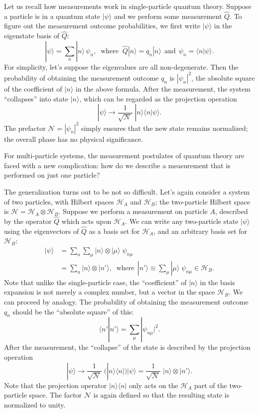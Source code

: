 \documentclass[pra,11pt]{revtex4}
\begin{document}
Let us recall how measurements work in single-particle quantum
theory.  Suppose a particle is in a quantum state $|\psi\rangle$
and we perform some measurement $\hat{Q}$.  To figure out the
measurement outcome probabilities, we first write $|\psi\rangle$ in
the eigenstate basis of $\hat{Q}$:
$$|\psi\rangle = \sum_n |n\rangle\,\psi_n, \;\;\mathrm{where}\;\;\hat{Q}|n\rangle = q_n |n\rangle \;\,\textrm{and}\;\, \psi_n = \langle n|\psi\rangle.$$
For simplicity, let's suppose the eigenvalues are all non-degenerate.
Then the probability of obtaining the measurement outcome $q_n$ is
$|\psi_n|^2$, the absolute square of the coefficient of
$|n\rangle$ in the above formula.  After the measurement, the system
``collapses'' into state $|n\rangle$, which can be regarded as the
projection operation
$$|\psi\rangle \rightarrow \frac{1}{\sqrt{\mathcal{N}}}\; |n\rangle\langle n|\psi\rangle.$$
The prefactor $\mathcal{N} = |\psi_n|^2$ simply ensures that the new
state remains normalized; the overall phase has no physical
significance.

For multi-particle systems, the measurement postulates of quantum
theory are faced with a new complication: how do we describe a
measurement that is performed on just one particle?

The generalization turns out to be not so difficult.  Let's again
consider a system of two particles, with Hilbert spaces
$\mathscr{H}_A$ and $\mathscr{H}_B$; the two-particle Hilbert space is
$\mathscr{H} = \mathscr{H}_A \otimes \mathscr{H}_B$.  Suppose we
perform a measurement on particle $A$, described by the operator
$\hat{Q}$ which acts upon $\mathscr{H}_A$.  We can write any two-particle
state $|\psi\rangle$ using the eigenvectors of $\hat{Q}$ as a basis
set for $\mathscr{H}_A$, and an arbitrary basis set for
$\mathscr{H}_B$:
$$\begin{aligned}|\psi\rangle &= \sum_{n}\sum_{\mu} |n\rangle\otimes |\mu\rangle \;\psi_{n\mu} \\&= \sum_n |n\rangle\otimes |n'\rangle, \;\;\mathrm{where}\;\,|n'\rangle\equiv \sum_\mu |\mu\rangle \;\psi_{n\mu} \in \mathscr{H}_B.\end{aligned}$$
Note that unlike the single-particle case, the ``coefficient'' of
$|n\rangle$ in the basis expansion is not merely a complex number, but
a vector in the space $\mathscr{H}_B$.  We can proceed by
analogy.  The probability of obtaining the measurement outcome $q_n$
should be the ``absolute square'' of this:
$$\langle n'|n'\rangle = \sum_\mu |\psi_{n\mu}|^2.$$
After the measurement, the ``collapse'' of the state is described by
the projection operation
$$|\psi\rangle \rightarrow \frac{1}{\sqrt{\mathcal{N}}}\; \Big(|n\rangle\langle n|\Big) |\psi\rangle = \frac{1}{\sqrt{\mathcal{N}}}\; |n\rangle\otimes |n'\rangle.$$
Note that the projection operator $|n\rangle\langle n|$ only acts on
the $\mathscr{H}_A$ part of the two-particle space.  The factor
$\mathcal{N}$ is again defined so that the resulting state is
normalized to unity.
\end{document}
